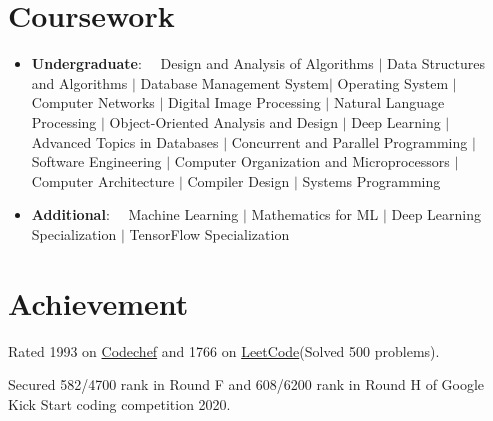 \documentclass[a4paper,20pt]{article}
\newcommand{\resumeItem}[2]{
  \item\small{
    \textbf{#1}{: #2 \vspace{-2pt}}
  }
}
\newcommand{\resumeSubItem}[2]{\resumeItem{#1}{#2}\vspace{-3pt}}
\newcommand{\resumeSubHeadingListStart}{\begin{itemize}[leftmargin=*]}
\newcommand{\resumeSubHeadingListEnd}{\end{itemize}}
\begin{document}
\vspace{-3pt}
\section{Coursework}
	\resumeSubHeadingListStart
	\resumeSubItem{Undergraduate}{~~Design and Analysis of Algorithms $|$ Data Structures and Algorithms $|$ Database Management System$|$ Operating System $|$ Computer Networks $|$ Digital Image Processing $|$ Natural Language Processing $|$ Object-Oriented Analysis and Design $|$ Deep Learning $|$ Advanced Topics in Databases $|$ Concurrent and Parallel Programming $|$ Software Engineering $|$ Computer Organization and Microprocessors $|$ Computer Architecture $|$ Compiler Design $|$ Systems Programming}
	\resumeSubItem{Additional}{~~Machine Learning $|$ Mathematics for ML $|$ Deep Learning Specialization $|$ TensorFlow Specialization}
	\resumeSubHeadingListEnd

\vspace{-3pt}
\section{Achievement}
\begin{description}[font=$\bullet$]
\item {Rated 1993 on \href{https://www.codechef.com/users/khimrajsuthar}{Codechef} and 1766 on \href{https://leetcode.com/khimrajsuthar/}{LeetCode}(Solved 500 problems).}
\vspace{-5pt}
\item {Secured 582/4700 rank in Round F and 608/6200 rank in Round H of Google Kick Start coding competition 2020.}

\end{description}
\end{document}
